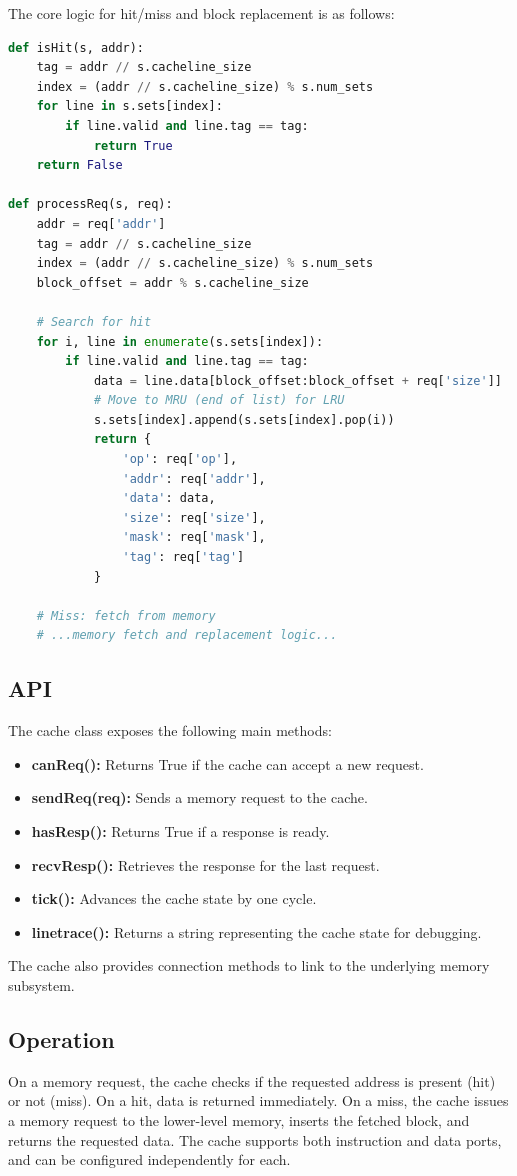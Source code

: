 \documentclass[12pt,a4paper]{report}
\begin{document}
The core logic for hit/miss and block replacement is as follows:

\begin{lstlisting}[language=Python]
def isHit(s, addr):
    tag = addr // s.cacheline_size
    index = (addr // s.cacheline_size) % s.num_sets
    for line in s.sets[index]:
        if line.valid and line.tag == tag:
            return True
    return False

def processReq(s, req):
    addr = req['addr']
    tag = addr // s.cacheline_size
    index = (addr // s.cacheline_size) % s.num_sets
    block_offset = addr % s.cacheline_size

    # Search for hit
    for i, line in enumerate(s.sets[index]):
        if line.valid and line.tag == tag:
            data = line.data[block_offset:block_offset + req['size']]
            # Move to MRU (end of list) for LRU
            s.sets[index].append(s.sets[index].pop(i))
            return {
                'op': req['op'],
                'addr': req['addr'],
                'data': data,
                'size': req['size'],
                'mask': req['mask'],
                'tag': req['tag']
            }

    # Miss: fetch from memory
    # ...memory fetch and replacement logic...
\end{lstlisting}

\subsection{API}
The cache class exposes the following main methods:
\begin{itemize}
  \item \textbf{canReq():} Returns True if the cache can accept a new request.
  \item \textbf{sendReq(req):} Sends a memory request to the cache.
  \item \textbf{hasResp():} Returns True if a response is ready.
  \item \textbf{recvResp():} Retrieves the response for the last request.
  \item \textbf{tick():} Advances the cache state by one cycle.
  \item \textbf{linetrace():} Returns a string representing the cache state for debugging.
\end{itemize}
The cache also provides connection methods to link to the underlying memory subsystem.

\subsection{Operation}
On a memory request, the cache checks if the requested address is present (hit) or not (miss). On a hit, data is returned immediately. On a miss, the cache issues a memory request to the lower-level memory, inserts the fetched block, and returns the requested data. The cache supports both instruction and data ports, and can be configured independently for each.
\end{document}
